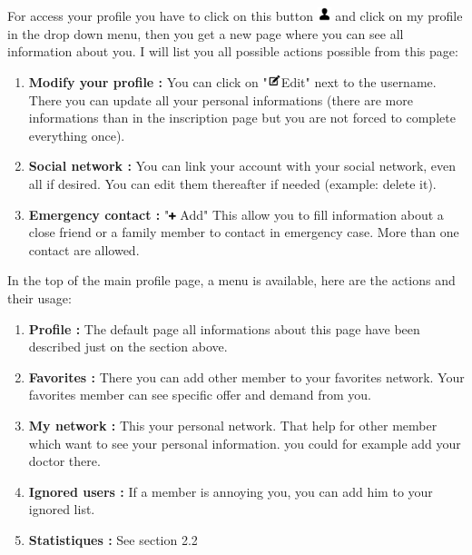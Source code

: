 \documentclass[11pt, a4paper]{article}   	%
\begin{document}
For access your profile you have to click on this button \includegraphics[width=0.4cm]{user_icon.png} and click on my profile in the drop down menu, then you get a new page where you can see all information about you. I will list you all possible actions possible from this page:
\begin{enumerate}
  \item \textbf{Modify your profile :} You can click on "\includegraphics[width=0.4cm]{edit_icon.png}Edit" next to the username. There you can update all your personal informations (there are more informations than in the inscription page but you are not forced to complete everything once).
  \item \textbf{Social network :} You can link your account with your social network, even all if desired. You can edit them thereafter if needed (example: delete it).
  \item \textbf{Emergency contact :} "\includegraphics[width=0.2cm]{plus_icon.png} Add" This allow you to fill information about a close friend or a family member to contact in emergency case. More than one contact are allowed.  
\end{enumerate}
In the top of the main profile page, a menu is available, here are the actions and their usage:
\begin{enumerate}
  \item \textbf{Profile :} The default page all informations about this page have been described just on the section above.
  \item \textbf{	Favorites :} There you can add other member to your favorites network. Your favorites member can see specific offer and demand from you.
  \item \textbf{My network :} This your personal network. That help for other member which want to see your personal information. you could for example add your doctor there.
  \item \textbf{Ignored users :} If a member is annoying you, you can add him to your ignored list.
  \item \textbf{Statistiques :} See section 2.2
\end{enumerate}
\end{document}
